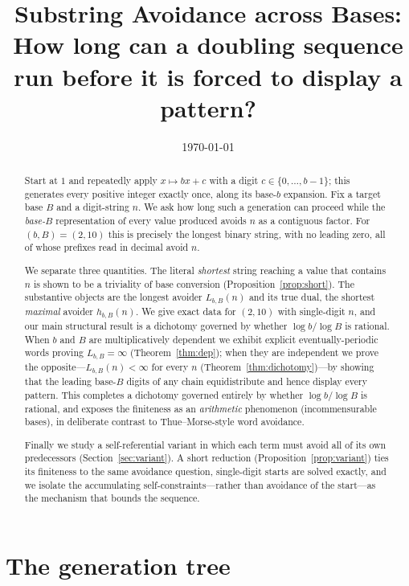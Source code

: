 \documentclass[11pt]{article}
\title{\bfseries Substring Avoidance across Bases:\\[2pt]
\large How long can a doubling sequence run before it is forced to display a pattern?}
\author{}
\date{\today}
\theoremstyle{plain}
\theoremstyle{definition}
\theoremstyle{remark}
\newcommand{\Lbb}{L_{b,B}}
\newcommand{\hbb}{h_{b,B}}
\begin{document}
\maketitle

\begin{abstract}
Start at $1$ and repeatedly apply $x\mapsto bx+c$ with a digit $c\in\{0,\dots,b-1\}$; this generates every positive integer exactly once, along its base-$b$ expansion. Fix a target base $B$ and a digit-string $n$. We ask how long such a generation can proceed while the \emph{base-$B$} representation of every value produced avoids $n$ as a contiguous factor. For $(b,B)=(2,10)$ this is precisely the longest binary string, with no leading zero, all of whose prefixes read in decimal avoid $n$.

We separate three quantities. The literal \emph{shortest} string reaching a value that contains $n$ is shown to be a triviality of base conversion (Proposition~\ref{prop:short}). The substantive objects are the longest avoider $\Lbb(n)$ and its true dual, the shortest \emph{maximal} avoider $\hbb(n)$. We give exact data for $(2,10)$ with single-digit $n$, and our main structural result is a dichotomy governed by whether $\log b/\log B$ is rational. When $b$ and $B$ are multiplicatively dependent we exhibit explicit eventually-periodic words proving $\Lbb=\infty$ (Theorem~\ref{thm:dep}); when they are independent we prove the opposite---$\Lbb(n)<\infty$ for every $n$ (Theorem~\ref{thm:dichotomy})---by showing that the leading base-$B$ digits of any chain equidistribute and hence display every pattern. This completes a dichotomy governed entirely by whether $\log b/\log B$ is rational, and exposes the finiteness as an \emph{arithmetic} phenomenon (incommensurable bases), in deliberate contrast to Thue--Morse-style word avoidance.

Finally we study a self-referential variant in which each term must avoid all of its own predecessors (Section~\ref{sec:variant}). A short reduction (Proposition~\ref{prop:variant}) ties its finiteness to the same avoidance question, single-digit starts are solved exactly, and we isolate the accumulating self-constraints---rather than avoidance of the start---as the mechanism that bounds the sequence.
\end{abstract}

\section{The generation tree}
\end{document}
